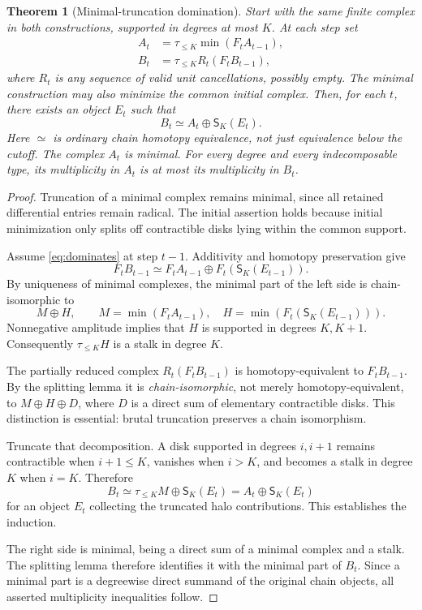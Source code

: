 \documentclass[11pt]{article}
\newtheorem{theorem}{Theorem}[section]
\theoremstyle{definition}\newtheorem{definition}[theorem]{Definition}
\theoremstyle{remark}\newtheorem{remark}[theorem]{Remark}
\newcommand{\Min}{\operatorname{min}}
\newcommand{\tr}{\tau_{\leq K}}
\newcommand{\stalk}[2]{\mathsf S_{#1}(#2)}
\begin{document}
\begin{theorem}[Minimal-truncation domination]\label{thm:domination}
Start with the same finite complex in both constructions, supported in degrees at most $K$. At each step set
\begin{align}
 A_t&=\tr\Min(F_t A_{t-1}),\label{eq:minstep}\\
 B_t&=\tr R_t(F_t B_{t-1}),\label{eq:compstep}
\end{align}
where $R_t$ is any sequence of valid unit cancellations, possibly empty. The minimal construction may also minimize the common initial complex. Then, for each $t$, there exists an object $E_t$ such that
\begin{equation}
 B_t\simeq A_t\oplus\stalk K{E_t}.\label{eq:dominates}
\end{equation}
Here $\simeq$ is ordinary chain homotopy equivalence, not just equivalence below the cutoff. The complex $A_t$ is minimal. For every degree and every indecomposable type, its multiplicity in $A_t$ is at most its multiplicity in $B_t$.
\end{theorem}
\begin{proof}
Truncation of a minimal complex remains minimal, since all retained differential entries remain radical. The initial assertion holds because initial minimization only splits off contractible disks lying within the common support.

Assume \eqref{eq:dominates} at step $t-1$. Additivity and homotopy preservation give
\[
 F_t B_{t-1}\simeq F_t A_{t-1}\oplus F_t(\stalk K{E_{t-1}}).
\]
By uniqueness of minimal complexes, the minimal part of the left side is chain-isomorphic to
\begin{equation}
 M\oplus H,\qquad
 M=\Min(F_t A_{t-1}),\quad
 H=\Min(F_t(\stalk K{E_{t-1}})).\label{eq:MH}
\end{equation}
Nonnegative amplitude implies that $H$ is supported in degrees $K,K+1$. Consequently $\tr H$ is a stalk in degree $K$.

The partially reduced complex $R_t(F_t B_{t-1})$ is homotopy-equivalent to $F_t B_{t-1}$. By the splitting lemma it is \emph{chain-isomorphic}, not merely homotopy-equivalent, to $M\oplus H\oplus D$, where $D$ is a direct sum of elementary contractible disks. This distinction is essential: brutal truncation preserves a chain isomorphism.

Truncate that decomposition. A disk supported in degrees $i,i+1$ remains contractible when $i+1\leq K$, vanishes when $i>K$, and becomes a stalk in degree $K$ when $i=K$. Therefore
\[
 B_t\simeq\tr M\oplus\stalk K{E_t}
       =A_t\oplus\stalk K{E_t}
\]
for an object $E_t$ collecting the truncated halo contributions. This establishes the induction.

The right side is minimal, being a direct sum of a minimal complex and a stalk. The splitting lemma therefore identifies it with the minimal part of $B_t$. Since a minimal part is a degreewise direct summand of the original chain objects, all asserted multiplicity inequalities follow.
\end{proof}
\end{document}
